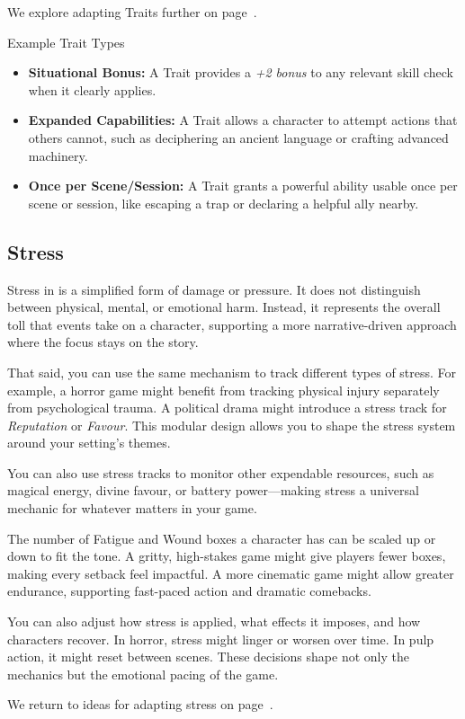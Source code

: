 We explore adapting Traits further on page~\pageref{toolbox:sec:adapting-traits}.

\begin{WyrdExampleSidebar}[float=!t]{Example Trait Types}
    \begin{itemize}
        \item \textbf{Situational Bonus:} A Trait provides a \emph{+2 bonus} to any relevant skill check when it clearly applies.
        \item \textbf{Expanded Capabilities:} A Trait allows a character to attempt actions that others cannot, such as deciphering an ancient language or crafting advanced machinery.
        \item \textbf{Once per Scene/Session:} A Trait grants a powerful ability usable once per scene or session, like escaping a trap or declaring a helpful ally nearby.
    \end{itemize}
\end{WyrdExampleSidebar}

\subsection{Stress}

Stress in \wyrd is a simplified form of damage or pressure. It does not distinguish between physical, mental, or emotional harm. Instead, it represents the overall toll that events take on a character, supporting a more narrative-driven approach where the focus stays on the story.

That said, you can use the same mechanism to track different types of stress. For example, a horror game might benefit from tracking physical injury separately from psychological trauma. A political drama might introduce a stress track for \textit{Reputation} or \textit{Favour}. This modular design allows you to shape the stress system around your setting’s themes.

You can also use stress tracks to monitor other expendable resources, such as magical energy, divine favour, or battery power—making stress a universal mechanic for whatever matters in your game.

The number of Fatigue and Wound boxes a character has can be scaled up or down to fit the tone. A gritty, high-stakes game might give players fewer boxes, making every setback feel impactful. A more cinematic game might allow greater endurance, supporting fast-paced action and dramatic comebacks.

You can also adjust how stress is applied, what effects it imposes, and how characters recover. In horror, stress might linger or worsen over time. In pulp action, it might reset between scenes. These decisions shape not only the mechanics but the emotional pacing of the game.

We return to ideas for adapting stress on page~\pageref{toolbox:sec:adapting-stress}.

